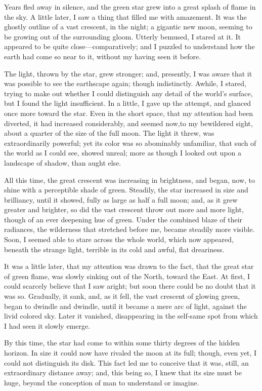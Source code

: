 Years fled away in silence, and the green star grew into a great splash of flame in the sky. A little later, I saw a thing that filled me with amazement. It was the ghostly outline of a vast crescent, in the night; a gigantic new moon, seeming to be growing out of the surrounding gloom. Utterly bemused, I stared at it. It appeared to be quite close---comparatively; and I puzzled to understand how the earth had come so near to it, without my having seen it before.

The light, thrown by the star, grew stronger; and, presently, I was aware that it was possible to see the earthscape again; though indistinctly. Awhile, I stared, trying to make out whether I could distinguish any detail of the world’s surface, but I found the light insufficient. In a little, I gave up the attempt, and glanced once more toward the star. Even in the short space, that my attention had been diverted, it had increased considerably, and seemed now,\linebreak to my bewildered sight, about a quarter of the size of the full moon. The light it threw, was extraordinarily powerful; yet its color was so abominably unfamiliar, that such of the world as I could see, showed unreal; more as though I looked out upon a landscape of shadow, than aught else.

All this time, the great crescent was increasing in brightness, and began, now, to shine with a perceptible shade of green. Steadily, the star increased in size and brilliancy, until it showed, fully as large as half a full moon; and, as it grew greater and brighter, so did the vast crescent throw out more and more light, though of an ever deepening hue of green. Under the combined blaze of their radiances, the wilderness that stretched before me, became steadily more visible. Soon, I seemed able to stare across the whole world, which now appeared, beneath the strange light, terrible in its cold and awful, flat dreariness.

It was a little later, that my attention was drawn to the fact, that the great star of green flame, was slowly sinking out of the North, toward the East. At first, I could scarcely believe that I saw aright; but soon there could be no doubt that it was so. Gradually, it sank, and, as it fell, the vast crescent of glowing green, began to dwindle and dwindle, until it became a mere arc of light, against the livid colored sky. Later it vanished, disappearing in the self-same spot from which I had seen it slowly emerge.

By this time, the star had come to within some thirty degrees of the hidden horizon. In size it could now have rivaled the moon at its full; though, even yet, I could not distinguish its disk. This fact led me to conceive that it was, still, an extraordinary distance away; and, this being so, I knew that its size must be huge, beyond the conception of man to understand or imagine.

